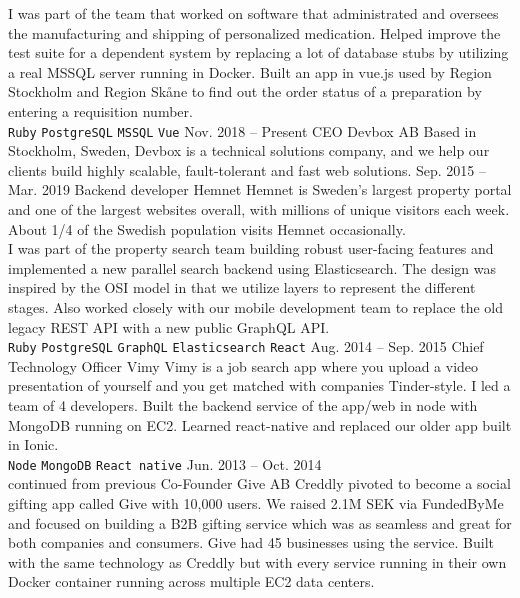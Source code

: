 \documentclass[9pt]{template} %
\begin{document}
\begin{entrylist}
{      I was part of the team that worked on software that administrated and oversees the
      manufacturing and shipping of personalized medication. Helped improve the test suite
      for a dependent system by replacing a lot of database stubs by utilizing a real MSSQL
      server running in Docker. Built an app in vue.js used by Region Stockholm and Region
      Skåne to find out the order status of a preparation by entering a requisition number.\\
      \texttt{Ruby}\slashsep
      \texttt{PostgreSQL}\slashsep
      \texttt{MSSQL}\slashsep
      \texttt{Vue}
    }
  \entry
    {Nov. 2018 -- Present}
    {CEO}
    {Devbox AB}
    {
      Based in Stockholm, Sweden, Devbox is a technical solutions company, and we help our
      clients build highly scalable, fault-tolerant and fast web solutions.
    }
  \entry
    {Sep. 2015 -- Mar. 2019}
    {Backend developer}
    {Hemnet}
    {
      Hemnet is Sweden’s largest property portal and one of the largest websites overall,
      with millions of unique visitors each week. About 1/4 of the Swedish population visits
      Hemnet occasionally.\\

      I was part of the property search team building robust user-facing features and implemented
      a new parallel search backend using Elasticsearch. The design was inspired by the OSI model
      in that we utilize layers to represent the different stages. Also worked closely with our
      mobile development team to replace the old legacy REST API with a new public GraphQL API.\\
      \texttt{Ruby}\slashsep
      \texttt{PostgreSQL}\slashsep
      \texttt{GraphQL}\slashsep
      \texttt{Elasticsearch}\slashsep
      \texttt{React}
    }
  \entry
    {Aug. 2014 -- Sep. 2015}
    {Chief Technology Officer}
    {Vimy}
    {
      Vimy is a job search app where you upload a video presentation of yourself and you get
      matched with companies Tinder-style. I led a team of 4 developers. Built the backend
      service of the app/web in node with MongoDB running on EC2. Learned react-native and
      replaced our older app built in Ionic.\\
      \texttt{Node}\slashsep
      \texttt{MongoDB}\slashsep
      \texttt{React native}
    }
  \entry
    {Jun. 2013 – Oct. 2014\\\footnotesize{continued from previous}}
    {Co-Founder}
    {Give AB}
    {
      Creddly pivoted to become a social gifting app called Give with 10,000 users. We raised
      2.1M SEK via FundedByMe and focused on building a B2B gifting service which was as seamless
      and great for both companies and consumers. Give had 45 businesses using the service. Built
      with the same technology as Creddly but with every service running in their own Docker
      container running across multiple EC2 data centers.\\

}
\end{entrylist}
\end{document}
